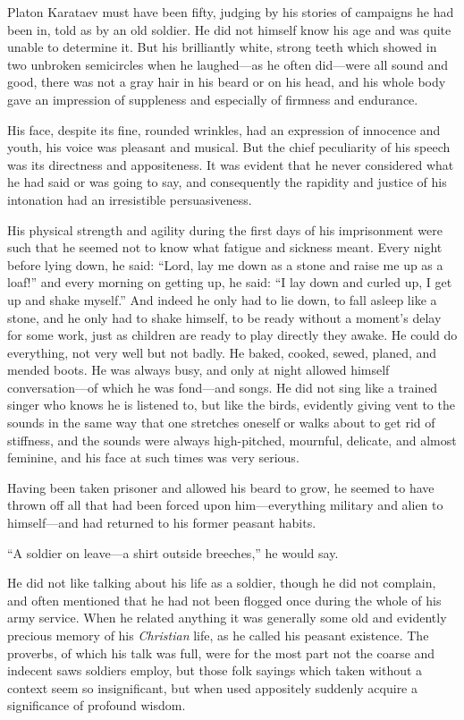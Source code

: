 Platon Karataev must have been fifty, judging by his stories of
campaigns he had been in, told as by an old soldier. He did not
himself know his age and was quite unable to determine it. But
his brilliantly white, strong teeth which showed in two unbroken
semicircles when he laughed---as he often did---were all sound
and good, there was not a gray hair in his beard or on his head,
and his whole body gave an impression of suppleness and
especially of firmness and endurance.

His face, despite its fine, rounded wrinkles, had an expression
of innocence and youth, his voice was pleasant and musical. But
the chief peculiarity of his speech was its directness and
appositeness. It was evident that he never considered what he had
said or was going to say, and consequently the rapidity and
justice of his intonation had an irresistible persuasiveness.

His physical strength and agility during the first days of his
imprisonment were such that he seemed not to know what fatigue
and sickness meant. Every night before lying down, he said:
``Lord, lay me down as a stone and raise me up as a loaf!'' and
every morning on getting up, he said: ``I lay down and curled up,
I get up and shake myself.'' And indeed he only had to lie down,
to fall asleep like a stone, and he only had to shake himself, to
be ready without a moment's delay for some work, just as children
are ready to play directly they awake. He could do everything,
not very well but not badly. He baked, cooked, sewed, planed, and
mended boots. He was always busy, and only at night allowed
himself conversation---of which he was fond---and songs. He did
not sing like a trained singer who knows he is listened to, but
like the birds, evidently giving vent to the sounds in the same
way that one stretches oneself or walks about to get rid of
stiffness, and the sounds were always high-pitched, mournful,
delicate, and almost feminine, and his face at such times was
very serious.

Having been taken prisoner and allowed his beard to grow, he
seemed to have thrown off all that had been forced upon
him---everything military and alien to himself---and had returned
to his former peasant habits.

``A soldier on leave---a shirt outside breeches,'' he would say.

He did not like talking about his life as a soldier, though he
did not complain, and often mentioned that he had not been
flogged once during the whole of his army service. When he
related anything it was generally some old and evidently precious
memory of his \emph{Christian} life, as he called his peasant
existence. The proverbs, of which his talk was full, were for the
most part not the coarse and indecent saws soldiers employ, but
those folk sayings which taken without a context seem so
insignificant, but when used appositely suddenly acquire a
significance of profound wisdom.

